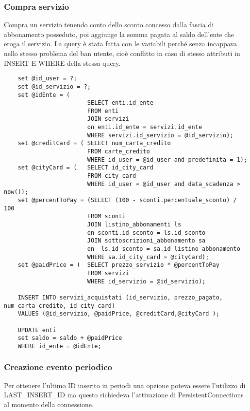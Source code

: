\subsubsection{Compra servizio}
Compra un servizio tenendo conto dello sconto concesso dalla fascia di abbonamento posseduto, poi aggiunge la somma pagata al saldo dell'ente che eroga il servizio.
La query è stata fatta con le variabili perché senza incappava nello stesso problema del ban utente, cioè conflitto in caso di stesso attributi in INSERT E WHERE della stessa query.
\begin{lstlisting}
    set @id_user = ?;
    set @id_servizio = ?;
    set @idEnte = (
                        SELECT enti.id_ente 
                        FROM enti
                        JOIN servizi
                        on enti.id_ente = servizi.id_ente
                        WHERE servizi.id_servizio = @id_servizio);
    set @creditCard = ( SELECT num_carta_credito 
                        FROM carte_credito
                        WHERE id_user = @id_user and predefinita = 1);
    set @cityCard = (   SELECT id_city_card
                        FROM city_card
                        WHERE id_user = @id_user and data_scadenza > now());
    set @percentToPay = (SELECT (100 - sconti.percentuale_sconto) / 100
                        FROM sconti 
                        JOIN listino_abbonamenti ls 
                        on sconti.id_sconto = ls.id_sconto
                        JOIN sottoscrizioni_abbonamento sa
                        on  ls.id_sconto = sa.id_listino_abbonamento
                        WHERE sa.id_city_card = @cityCard);
    set @paidPrice = (  SELECT prezzo_servizio * @percentToPay
                        FROM servizi
                        WHERE id_servizio = @id_servizio);

    INSERT INTO servizi_acquistati (id_servizio, prezzo_pagato, num_carta_credito, id_city_card) 
    VALUES (@id_servizio, @paidPrice, @creditCard,@cityCard );
    
    UPDATE enti 
    set saldo = saldo + @paidPrice
    WHERE id_ente = @idEnte;
\end{lstlisting}




\subsubsection{Creazione evento periodico}
Per ottenere l'ultimo ID inserito in periodi una opzione poteva essere l'utilizzo di LAST{\_}INSERT{\_}ID ma questo richiedeva l'attivazione di PersistentConnections al momento della connessione.


